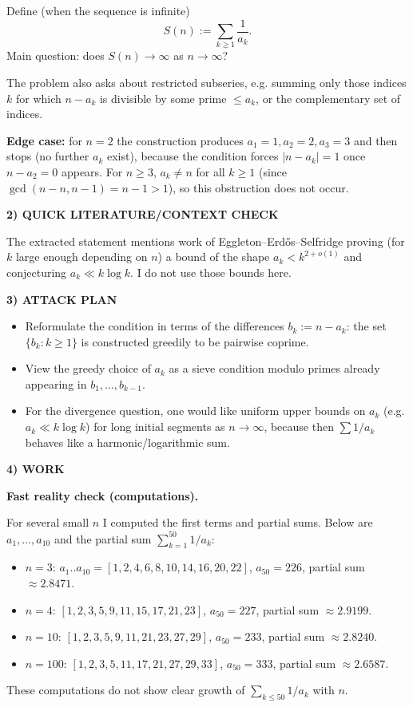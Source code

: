 Define (when the sequence is infinite)
\[S(n):=\sum_{k\ge 1} \frac1{a_k}.
\]
Main question: does $S(n)\to\infty$ as $n\to\infty$?

The problem also asks about restricted subseries, e.g. summing only those indices $k$ for which $n-a_k$ is divisible by some prime $\le a_k$, or the complementary set of indices.

\textbf{Edge case:} for $n=2$ the construction produces $a_1=1,a_2=2,a_3=3$ and then stops (no further $a_k$ exist), because the condition forces $|n-a_k|=1$ once $n-a_2=0$ appears. For $n\ge 3$, $a_k\neq n$ for all $k\ge 1$ (since $\gcd(n-n,n-1)=n-1>1$), so this obstruction does not occur.

\noindent\textbf{2) QUICK LITERATURE/CONTEXT CHECK}

The extracted statement mentions work of Eggleton--Erd\H{o}s--Selfridge proving (for $k$ large enough depending on $n$) a bound of the shape $a_k<k^{2+o(1)}$ and conjecturing $a_k\ll k\log k$. I do not use those bounds here.

\noindent\textbf{3) ATTACK PLAN}

\begin{itemize}
\item Reformulate the condition in terms of the differences $b_k:=n-a_k$: the set $\{b_k:k\ge 1\}$ is constructed greedily to be pairwise coprime.
\item View the greedy choice of $a_k$ as a sieve condition modulo primes already appearing in $b_1,\dots,b_{k-1}$.
\item For the divergence question, one would like uniform upper bounds on $a_k$ (e.g. $a_k\ll k\log k$) for long initial segments as $n\to\infty$, because then $\sum 1/a_k$ behaves like a harmonic/logarithmic sum.
\end{itemize}

\noindent\textbf{4) WORK}

\textbf{Fast reality check (computations).}

For several small $n$ I computed the first terms and partial sums.  Below are $a_1,\dots,a_{10}$ and the partial sum $\sum_{k=1}^{50}1/a_k$:
\begin{itemize}
\item $n=3$: $a_1..a_{10}=[1,2,4,6,8,10,14,16,20,22]$, $a_{50}=226$, partial sum $\approx 2.8471$.
\item $n=4$: $[1,2,3,5,9,11,15,17,21,23]$, $a_{50}=227$, partial sum $\approx 2.9199$.
\item $n=10$: $[1,2,3,5,9,11,21,23,27,29]$, $a_{50}=233$, partial sum $\approx 2.8240$.
\item $n=100$: $[1,2,3,5,11,17,21,27,29,33]$, $a_{50}=333$, partial sum $\approx 2.6587$.
\end{itemize}
These computations do not show clear growth of $\sum_{k\le 50}1/a_k$ with $n$.

